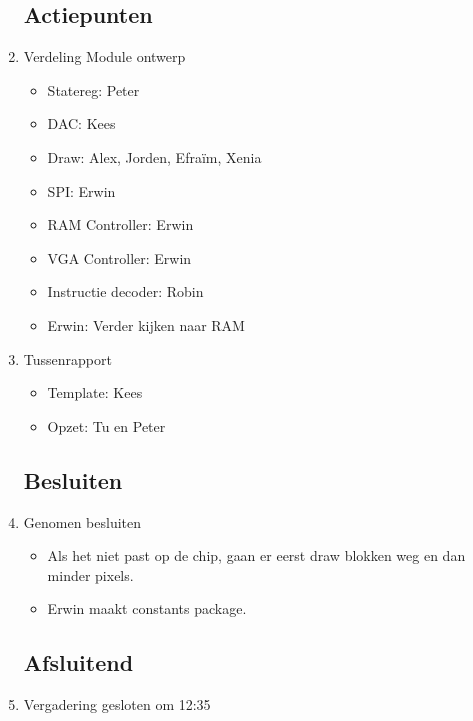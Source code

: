 \documentclass{article}
\begin{document}
\begin{enumerate}
	\subsection*{Actiepunten}
	\item Verdeling Module ontwerp
	\begin{itemize}
		\item Statereg:  Peter
		\item DAC: Kees
		\item Draw: Alex, Jorden, Efraïm, Xenia
		\item SPI: Erwin
		\item RAM Controller: Erwin
		\item VGA Controller: Erwin
		\item Instructie decoder: Robin
		\item Erwin: Verder kijken naar RAM
	\end{itemize}
	\item Tussenrapport
	\begin{itemize}
		\item Template: Kees
		\item Opzet: Tu en Peter
	\end{itemize}

	\subsection*{Besluiten}
	\item Genomen besluiten
	\begin{itemize}
		\item Als het niet past op de chip, gaan er eerst draw blokken weg en dan minder pixels.
		\item Erwin maakt constants package.
	\end{itemize}

	\noindent 
	\subsection*{Afsluitend}
	\item Vergadering gesloten om 12:35 %

\end{enumerate}
\end{document}
